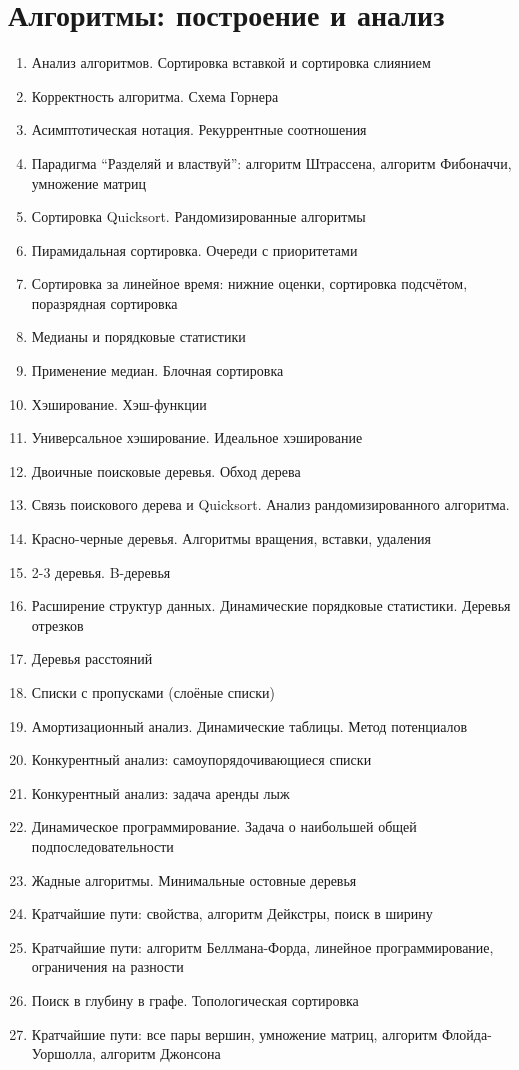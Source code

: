 \documentclass[a4paper,10pt]{article}
\begin{document}
\section*{Алгоритмы: построение и анализ}
\begin{enumerate}
\item Анализ алгоритмов. Сортировка вставкой и сортировка слиянием
\item Корректность алгоритма. Схема Горнера
\item Асимптотическая нотация. Рекуррентные соотношения
\item Парадигма ``Разделяй и властвуй'': алгоритм Штрассена, алгоритм Фибоначчи, умножение матриц
\item Сортировка Quicksort. Рандомизированные алгоритмы
\item Пирамидальная сортировка. Очереди с приоритетами
\item Сортировка за линейное время: нижние оценки, сортировка подсчётом, поразрядная сортировка
\item Медианы и порядковые статистики
\item Применение медиан. Блочная сортировка
\item Хэширование. Хэш-функции
\item Универсальное хэширование. Идеальное хэширование
\item Двоичные поисковые деревья. Обход дерева
\item Связь поискового дерева и Quicksort. Анализ рандомизированного алгоритма.
\item Красно-черные деревья. Алгоритмы вращения, вставки, удаления
\item 2-3 деревья. B-деревья
\item Расширение структур данных. Динамические порядковые статистики. Деревья отрезков
\item Деревья расстояний
\item Списки с пропусками (слоёные списки)
\item Амортизационный анализ. Динамические таблицы. Метод потенциалов
\item Конкурентный анализ: самоупорядочивающиеся списки
\item Конкурентный анализ: задача аренды лыж
\item Динамическое программирование. Задача о наибольшей общей подпоследовательности
\item Жадные алгоритмы. Минимальные остовные деревья
\item Кратчайшие пути: свойства, алгоритм Дейкстры, поиск в ширину
\item Кратчайшие пути: алгоритм Беллмана-Форда, линейное программирование, ограничения на разности
\item Поиск в глубину в графе. Топологическая сортировка
\item Кратчайшие пути: все пары вершин, умножение матриц, алгоритм Флойда-Уоршолла, алгоритм Джонсона
\end{enumerate}
\end{document}
